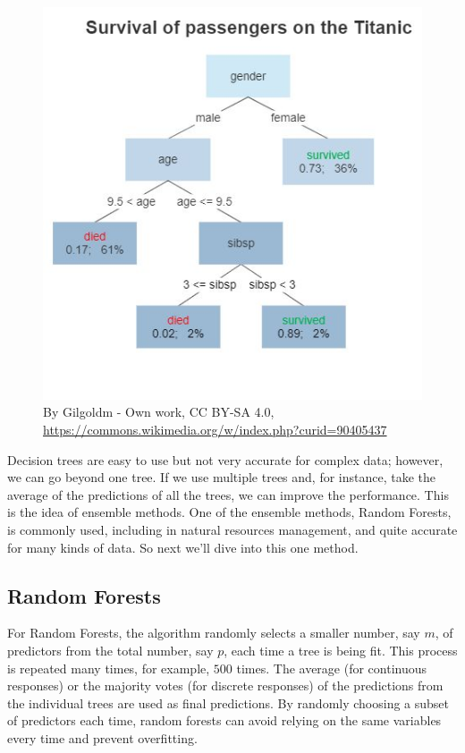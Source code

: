 \documentclass[
]{book}
\begin{document}
\begin{figure}
\centering
\includegraphics{images/Decision_Tree.jpg}
\caption{By Gilgoldm - Own work, CC BY-SA 4.0, \url{https://commons.wikimedia.org/w/index.php?curid=90405437}}
\end{figure}

Decision trees are easy to use but not very accurate for complex data; however, we can go beyond one tree. If we use multiple trees and, for instance, take the average of the predictions of all the trees, we can improve the performance. This is the idea of ensemble methods. One of the ensemble methods, Random Forests, is commonly used, including in natural resources management, and quite accurate for many kinds of data. So next we'll dive into this one method.

\hypertarget{random-forests}{%
\subsection{Random Forests}\label{random-forests}}

For Random Forests, the algorithm randomly selects a smaller number, say \(m\), of predictors from the total number, say \(p\), each time a tree is being fit. This process is repeated many times, for example, \(500\) times. The average (for continuous responses) or the majority votes (for discrete responses) of the predictions from the individual trees are used as final predictions. By randomly choosing a subset of predictors each time, random forests can avoid relying on the same variables every time and prevent overfitting.
\end{document}
